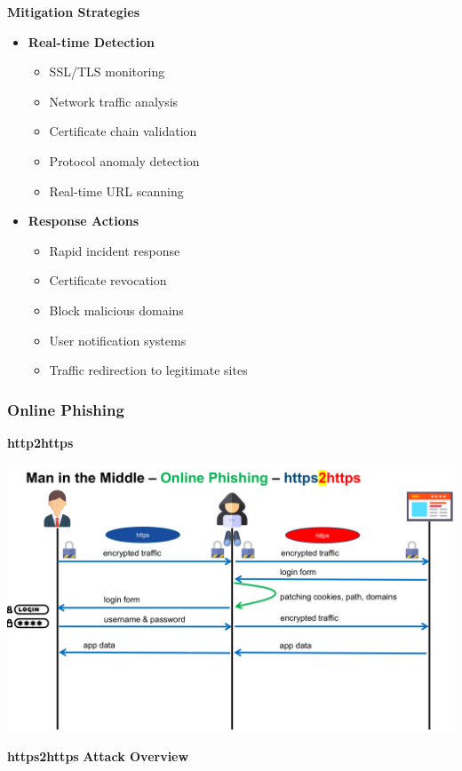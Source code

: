 \textbf{Mitigation Strategies}
\begin{itemize}
    \item \textbf{Real-time Detection}
        \begin{itemize}
            \item SSL/TLS monitoring
            \item Network traffic analysis
            \item Certificate chain validation
            \item Protocol anomaly detection
            \item Real-time URL scanning
        \end{itemize}
    
    \item \textbf{Response Actions}
        \begin{itemize}
            \item Rapid incident response
            \item Certificate revocation
            \item Block malicious domains
            \item User notification systems
            \item Traffic redirection to legitimate sites
        \end{itemize}
\end{itemize}

\subsubsection{Online Phishing}
\textbf{http2https}
\begin{center}
\includegraphics[width=\textwidth]{resources/07-mitm-online-phishing-https2https.png}  
\end{center}
\textbf{https2https}
\textbf{Attack Overview}

